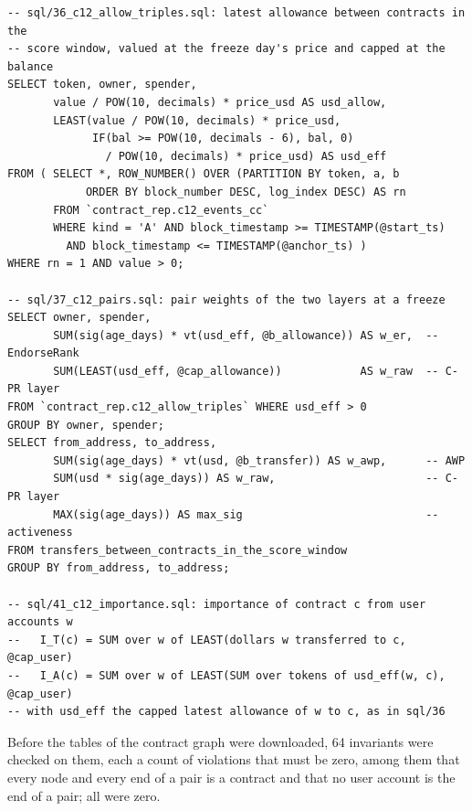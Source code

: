 \documentclass[10pt,letterpaper]{article}
\begin{document}
\begin{Verbatim}[fontsize=\small]
-- sql/36_c12_allow_triples.sql: latest allowance between contracts in the
-- score window, valued at the freeze day's price and capped at the balance
SELECT token, owner, spender,
       value / POW(10, decimals) * price_usd AS usd_allow,
       LEAST(value / POW(10, decimals) * price_usd,
             IF(bal >= POW(10, decimals - 6), bal, 0)
               / POW(10, decimals) * price_usd) AS usd_eff
FROM ( SELECT *, ROW_NUMBER() OVER (PARTITION BY token, a, b
            ORDER BY block_number DESC, log_index DESC) AS rn
       FROM `contract_rep.c12_events_cc`
       WHERE kind = 'A' AND block_timestamp >= TIMESTAMP(@start_ts)
         AND block_timestamp <= TIMESTAMP(@anchor_ts) )
WHERE rn = 1 AND value > 0;

-- sql/37_c12_pairs.sql: pair weights of the two layers at a freeze
SELECT owner, spender,
       SUM(sig(age_days) * vt(usd_eff, @b_allowance)) AS w_er,  -- EndorseRank
       SUM(LEAST(usd_eff, @cap_allowance))            AS w_raw  -- C-PR layer
FROM `contract_rep.c12_allow_triples` WHERE usd_eff > 0
GROUP BY owner, spender;
SELECT from_address, to_address,
       SUM(sig(age_days) * vt(usd, @b_transfer)) AS w_awp,      -- AWP
       SUM(usd * sig(age_days)) AS w_raw,                       -- C-PR layer
       MAX(sig(age_days)) AS max_sig                            -- activeness
FROM transfers_between_contracts_in_the_score_window
GROUP BY from_address, to_address;

-- sql/41_c12_importance.sql: importance of contract c from user accounts w
--   I_T(c) = SUM over w of LEAST(dollars w transferred to c, @cap_user)
--   I_A(c) = SUM over w of LEAST(SUM over tokens of usd_eff(w, c), @cap_user)
-- with usd_eff the capped latest allowance of w to c, as in sql/36
\end{Verbatim}

Before the tables of the contract graph were downloaded, 64 invariants were checked on them, each a count of violations that must be zero, among them that every node and every end of a pair is a contract and that no user account is the end of a pair; all were zero.
\end{document}
